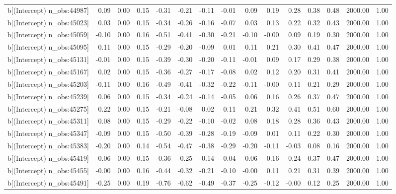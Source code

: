 \begin{table}[ht]
\begin{tabular}{rrrrrrrrrrrrrrr}
  b[(Intercept) n\_obs:44987] & 0.09 & 0.00 & 0.15 & -0.31 & -0.21 & -0.11 & -0.01 & 0.09 & 0.19 & 0.28 & 0.38 & 0.48 & 2000.00 & 1.00 \\ 
  b[(Intercept) n\_obs:45023] & 0.03 & 0.00 & 0.15 & -0.34 & -0.26 & -0.16 & -0.07 & 0.03 & 0.13 & 0.22 & 0.32 & 0.43 & 2000.00 & 1.00 \\ 
  b[(Intercept) n\_obs:45059] & -0.10 & 0.00 & 0.16 & -0.51 & -0.41 & -0.30 & -0.21 & -0.10 & -0.00 & 0.09 & 0.19 & 0.30 & 2000.00 & 1.00 \\ 
  b[(Intercept) n\_obs:45095] & 0.11 & 0.00 & 0.15 & -0.29 & -0.20 & -0.09 & 0.01 & 0.11 & 0.21 & 0.30 & 0.41 & 0.47 & 2000.00 & 1.00 \\ 
  b[(Intercept) n\_obs:45131] & -0.01 & 0.00 & 0.15 & -0.39 & -0.30 & -0.20 & -0.11 & -0.01 & 0.09 & 0.17 & 0.29 & 0.38 & 2000.00 & 1.00 \\ 
  b[(Intercept) n\_obs:45167] & 0.02 & 0.00 & 0.15 & -0.36 & -0.27 & -0.17 & -0.08 & 0.02 & 0.12 & 0.20 & 0.31 & 0.41 & 2000.00 & 1.00 \\ 
  b[(Intercept) n\_obs:45203] & -0.11 & 0.00 & 0.16 & -0.49 & -0.41 & -0.32 & -0.22 & -0.11 & -0.00 & 0.11 & 0.21 & 0.29 & 2000.00 & 1.00 \\ 
  b[(Intercept) n\_obs:45239] & 0.06 & 0.00 & 0.15 & -0.34 & -0.24 & -0.14 & -0.05 & 0.06 & 0.16 & 0.26 & 0.37 & 0.47 & 2000.00 & 1.00 \\ 
  b[(Intercept) n\_obs:45275] & 0.22 & 0.00 & 0.15 & -0.21 & -0.08 & 0.02 & 0.11 & 0.21 & 0.32 & 0.41 & 0.51 & 0.60 & 2000.00 & 1.00 \\ 
  b[(Intercept) n\_obs:45311] & 0.08 & 0.00 & 0.15 & -0.29 & -0.22 & -0.10 & -0.02 & 0.08 & 0.18 & 0.28 & 0.36 & 0.43 & 2000.00 & 1.00 \\ 
  b[(Intercept) n\_obs:45347] & -0.09 & 0.00 & 0.15 & -0.50 & -0.39 & -0.28 & -0.19 & -0.09 & 0.01 & 0.11 & 0.22 & 0.30 & 2000.00 & 1.00 \\ 
  b[(Intercept) n\_obs:45383] & -0.20 & 0.00 & 0.14 & -0.54 & -0.47 & -0.38 & -0.29 & -0.20 & -0.11 & -0.03 & 0.08 & 0.16 & 2000.00 & 1.00 \\ 
  b[(Intercept) n\_obs:45419] & 0.06 & 0.00 & 0.15 & -0.36 & -0.25 & -0.14 & -0.04 & 0.06 & 0.16 & 0.24 & 0.37 & 0.47 & 2000.00 & 1.00 \\ 
  b[(Intercept) n\_obs:45455] & -0.00 & 0.00 & 0.16 & -0.44 & -0.32 & -0.21 & -0.10 & -0.00 & 0.11 & 0.21 & 0.31 & 0.39 & 2000.00 & 1.00 \\ 
  b[(Intercept) n\_obs:45491] & -0.25 & 0.00 & 0.19 & -0.76 & -0.62 & -0.49 & -0.37 & -0.25 & -0.12 & -0.00 & 0.12 & 0.25 & 2000.00 & 1.00 \\ 

\end{tabular}
\end{table}

